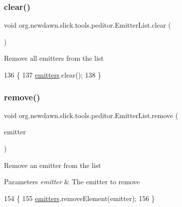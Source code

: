 \subsubsection{\texorpdfstring{clear()}{clear()}}
{\footnotesize\ttfamily void org.\+newdawn.\+slick.\+tools.\+peditor.\+Emitter\+List.\+clear (\begin{DoxyParamCaption}{ }\end{DoxyParamCaption})\hspace{0.3cm}{\ttfamily [inline]}}

Remove all emitters from the list 
\begin{DoxyCode}
136                         \{
137         \mbox{\hyperlink{classorg_1_1newdawn_1_1slick_1_1tools_1_1peditor_1_1_emitter_list_af49e1d51ea3ee483a77a30ce7aaa6d89}{emitters}}.clear();
138     \}
\end{DoxyCode}
\mbox{\label{classorg_1_1newdawn_1_1slick_1_1tools_1_1peditor_1_1_emitter_list_af62b14c24122b09a3a77f2eaea806e7d}} 
\subsubsection{\texorpdfstring{remove()}{remove()}}
{\footnotesize\ttfamily void org.\+newdawn.\+slick.\+tools.\+peditor.\+Emitter\+List.\+remove (\begin{DoxyParamCaption}\item[{\mbox{\hyperlink{classorg_1_1newdawn_1_1slick_1_1particles_1_1_configurable_emitter}{Configurable\+Emitter}}}]{emitter }\end{DoxyParamCaption})\hspace{0.3cm}{\ttfamily [inline]}}

Remove an emitter from the list


\begin{DoxyParams}{Parameters}
{\em emitter} & The emitter to remove \\
\hline
\end{DoxyParams}

\begin{DoxyCode}
154                                                     \{
155         \mbox{\hyperlink{classorg_1_1newdawn_1_1slick_1_1tools_1_1peditor_1_1_emitter_list_af49e1d51ea3ee483a77a30ce7aaa6d89}{emitters}}.removeElement(emitter);
156     \}
\end{DoxyCode}
\mbox{\label{classorg_1_1newdawn_1_1slick_1_1tools_1_1peditor_1_1_emitter_list_a2d4c1c8b76d20c25f3a7183ab5b4cd25}} 
